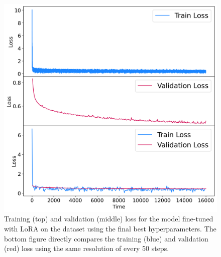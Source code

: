 \documentclass[11pt,a4paper]{article}
\begin{document}
\begin{figure}
    \centering
    \includegraphics[width=\columnwidth, keepaspectratio]{../plots/lora_final_loss.png}
    \caption{Training (top) and validation (middle) loss for the model fine-tuned with LoRA on the dataset using the final best hyperparameters. The bottom figure directly compares the training (blue) and validation (red) loss using the same resolution of every 50 steps.}
\label{fig:lora_final_loss}
\end{figure}
\end{document}
